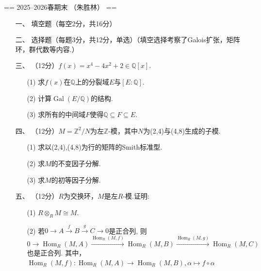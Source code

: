 
== 2025--2026春期末 （朱胜林） ==
\begin{itemize}

\item[一、] 填空题（每空2分，共16分）

\item[二、] 选择题（每题3分，共12分，单选）（填空选择考察了Galois扩张，矩阵环，群代数等内容.）

\item[三、] （12分）$f(x) = x^{4}-4x^{2}+2\in \mathbb{Q}[x]$.
\begin{itemize}
\item[(1)]求$f(x)$在$\mathbb{Q}$上的分裂域$E$与$[E:\mathbb{Q}]$.

\item[(2)]计算$\operatorname{Gal}(E/\mathbb{Q})$的结构.

\item[(3)]求所有的中间域$F$使得$\mathbb{Q}\subseteq F\subseteq E$.
\end{itemize}

\item[四、]（12分）$M=\mathbb{Z}^{2}/N$为左$\mathbb{Z}$-模，其中$N$为(2,4)与(4,8)生成的子模.
\begin{itemize}
\item[(1)] 求以(2,4),(4,8)为行的矩阵的Smith标准型.
\item[(2)] 求$M$的不变因子分解.
\item[(3)] 求$M$的初等因子分解.
\end{itemize}

\item[五、]（12分）$R$为交换环，$M$是左$R$-模.证明:
\begin{itemize}
\item[(1)] $R\otimes_{R} M\cong M$.
\item[(2)] 若$0\longrightarrow A\stackrel{f}{\longrightarrow}B\stackrel{g}{\longrightarrow}C\longrightarrow 0$是正合列,
则$0\longrightarrow \operatorname{Hom}_{R}(M,A)\stackrel{\operatorname{Hom}_{R}(M,f)}{\longrightarrow}\operatorname{Hom}_{R}(M,B)\stackrel{\operatorname{Hom}_{R}(M,g)}{\longrightarrow}\operatorname{Hom}_{R}(M,C)$也是正合列.
其中，$\operatorname{Hom}_{R}(M,f):\operatorname{Hom}_{R}(M,A)\to\operatorname{Hom}_{R}(M,B), \alpha\mapsto f\circ \alpha$
\end{itemize}


\end{itemize}
